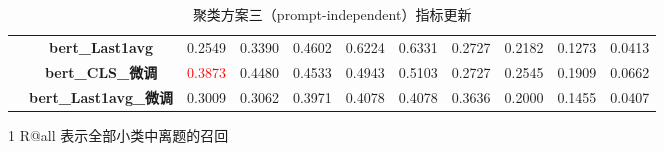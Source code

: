 \documentclass[11pt]{article}
\begin{document}
\begin{CJK}{UTF8}{gkai}
\begin{table}[htbp]
\begin{tabular}{c|c|c|c|c|c|c|c|c|c|c}
      & \textbf{bert\_Last1avg} & 0.2549  & 0.3390  & 0.4602  & 0.6224  & 0.6331  & 0.2727  & 0.2182  & 0.1273  & 0.0413  \\
      & \textbf{bert\_CLS\_微调} & \textcolor{red}{0.3873}  & 0.4480  & 0.4533  & 0.4943  & 0.5103  & 0.2727  & 0.2545  & 0.1909  & 0.0662  \\
      & \textbf{bert\_Last1avg\_微调} & 0.3009  & 0.3062  & 0.3971  & 0.4078  & 0.4078  & 0.3636  & 0.2000  & 0.1455  & 0.0407  \\
      \hline
    \end{tabular}%
    \begin{tablenotes}    %
      \footnotesize               %
      \item[1] R@all 表示全部小类中离题的召回
    \end{tablenotes} 
    \caption{聚类方案三（prompt-independent）指标更新}
  \label{tab:addlabel}%
\end{table}%



\end{CJK}
\end{document}
